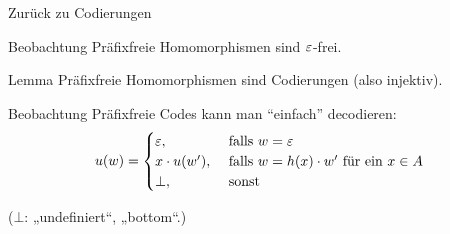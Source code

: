 \begin{frame}{Zurück zu Codierungen}
	\begin{block}{Beobachtung}
		Präfixfreie Homomorphismen sind $\varepsilon$-frei.
	\end{block}

	\pause
	\begin{block}{Lemma}
		Präfixfreie Homomorphismen sind Codierungen (also injektiv).
	\end{block}

	\pause
	\begin{block}{Beobachtung}
		Präfixfreie Codes kann man \enquote{einfach} decodieren:
		\[
		u(w) = 
		\begin{cases}
		\varepsilon, & \text{ falls } w=\varepsilon\\
		x\cdot u(w'), & \text{ falls } w=h(x) \cdot w' \text{ für ein } x\in A \\
		\bot,  & \text{ sonst }\\
		\end{cases}
		\]
	\end{block}
	($\bot$: „undefiniert“, „bottom“.)
	
\end{frame}